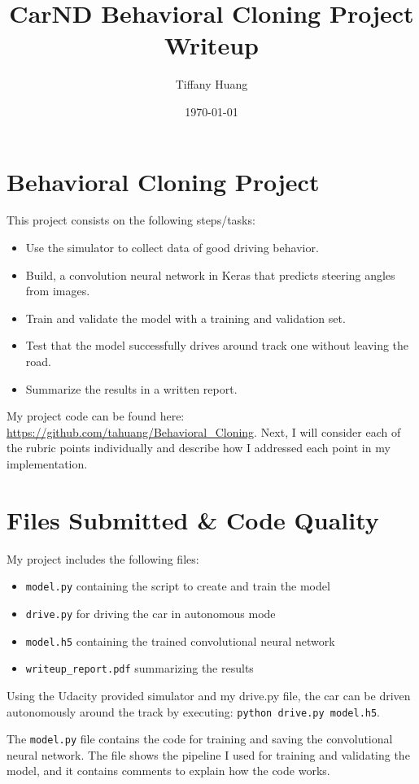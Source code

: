 \documentclass[12pt]{article}
\title{CarND Behavioral Cloning Project Writeup}
\author{Tiffany Huang}
\date{\today}
\begin{document}
\maketitle


\section{Behavioral Cloning Project}
This project consists on the following steps/tasks:
\begin{itemize}
\item {Use the simulator to collect data of good driving behavior.}
\item {Build, a convolution neural network in Keras that predicts steering angles from images.}
\item {Train and validate the model with a training and validation set.}
\item {Test that the model successfully drives around track one without leaving the road.}
\item {Summarize the results in a written report.}
\end{itemize}
My project code can be found here: \url{https://github.com/tahuang/Behavioral_Cloning}. Next, I will consider each of the rubric points individually and describe how I addressed each point in my implementation.

\section{Files Submitted \& Code Quality}
My project includes the following files:
\begin{itemize}
\item {\texttt{model.py} containing the script to create and train the model}
\item {\texttt{drive.py} for driving the car in autonomous mode}
\item {\texttt{model.h5} containing the trained convolutional neural network}
\item {\texttt{writeup\_report.pdf} summarizing the results}
\end{itemize}

Using the Udacity provided simulator and my drive.py file, the car can be driven autonomously around the track by executing: \texttt{python drive.py model.h5}.

The \texttt{model.py} file contains the code for training and saving the convolutional neural network. The file shows the pipeline I used for training and validating the model, and it contains comments to explain how the code works.
\end{document}
